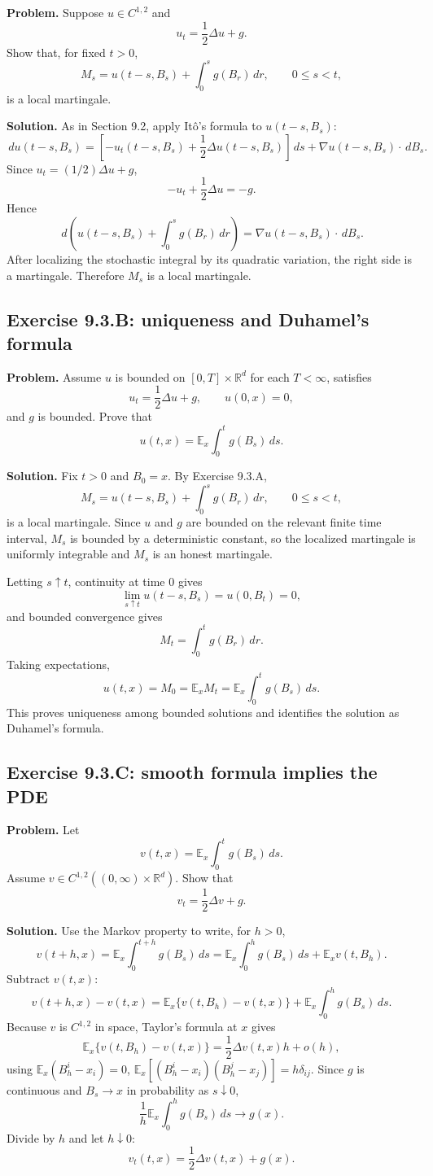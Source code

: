 \documentclass[11pt]{article}
\newcommand{\R}{\mathbb{R}}
\newcommand{\E}{\mathbb{E}}
\newcommand{\dd}{\,d}
\newcommand{\Del}{\Delta}
\begin{document}
\noindent\textbf{Problem.}
Suppose $u\in C^{1,2}$ and
\[
  u_t=\frac12\Del u+g.
\]
Show that, for fixed $t>0$,
\[
  M_s=u(t-s,B_s)+\int_0^s g(B_r)\dd r,\qquad 0\le s<t,
\]
is a local martingale.

\noindent\textbf{Solution.}
As in Section 9.2, apply It\^o's formula to $u(t-s,B_s)$:
\[
  \dd u(t-s,B_s)
  =
  \left[-u_t(t-s,B_s)+\frac12\Del u(t-s,B_s)\right]\dd s
  +\nabla u(t-s,B_s)\cdot\dd B_s.
\]
Since $u_t=(1/2)\Del u+g$,
\[
  -u_t+\frac12\Del u=-g.
\]
Hence
\[
  \dd\left(u(t-s,B_s)+\int_0^s g(B_r)\dd r\right)
  =
  \nabla u(t-s,B_s)\cdot\dd B_s.
\]
After localizing the stochastic integral by its quadratic variation,
the right side is a martingale.  Therefore $M_s$ is a local martingale.

\subsection*{Exercise 9.3.B: uniqueness and Duhamel's formula}

\noindent\textbf{Problem.}
Assume $u$ is bounded on $[0,T]\times\R^d$ for each $T<\infty$,
satisfies
\[
  u_t=\frac12\Del u+g,\qquad u(0,x)=0,
\]
and $g$ is bounded.  Prove that
\[
  u(t,x)=\E_x\int_0^t g(B_s)\dd s.
\]

\noindent\textbf{Solution.}
Fix $t>0$ and $B_0=x$.  By Exercise 9.3.A,
\[
  M_s=u(t-s,B_s)+\int_0^s g(B_r)\dd r,\qquad 0\le s<t,
\]
is a local martingale.  Since $u$ and $g$ are bounded on the relevant
finite time interval, $M_s$ is bounded by a deterministic constant, so
the localized martingale is uniformly integrable and $M_s$ is an honest
martingale.

Letting $s\uparrow t$, continuity at time $0$ gives
\[
  \lim_{s\uparrow t}u(t-s,B_s)=u(0,B_t)=0,
\]
and bounded convergence gives
\[
  M_t=\int_0^t g(B_r)\dd r.
\]
Taking expectations,
\[
  u(t,x)=M_0=\E_xM_t
  =
  \E_x\int_0^t g(B_s)\dd s.
\]
This proves uniqueness among bounded solutions and identifies the
solution as Duhamel's formula.

\subsection*{Exercise 9.3.C: smooth formula implies the PDE}

\noindent\textbf{Problem.}
Let
\[
  v(t,x)=\E_x\int_0^t g(B_s)\dd s.
\]
Assume $v\in C^{1,2}((0,\infty)\times\R^d)$.  Show that
\[
  v_t=\frac12\Del v+g.
\]

\noindent\textbf{Solution.}
Use the Markov property to write, for $h>0$,
\[
  v(t+h,x)
  =
  \E_x\int_0^{t+h}g(B_s)\dd s
  =
  \E_x\int_0^h g(B_s)\dd s+\E_x v(t,B_h).
\]
Subtract $v(t,x)$:
\[
  v(t+h,x)-v(t,x)
  =
  \E_x\{v(t,B_h)-v(t,x)\}
  +\E_x\int_0^h g(B_s)\dd s.
\]
Because $v$ is $C^{1,2}$ in space, Taylor's formula at $x$ gives
\[
  \E_x\{v(t,B_h)-v(t,x)\}
  =
  \frac12\Del v(t,x)h+o(h),
\]
using $\E_x(B_h^i-x_i)=0$,
$\E_x[(B_h^i-x_i)(B_h^j-x_j)]=h\delta_{ij}$.  Since $g$ is continuous
and $B_s\to x$ in probability as $s\downarrow0$,
\[
  \frac1h\E_x\int_0^h g(B_s)\dd s\to g(x).
\]
Divide by $h$ and let $h\downarrow0$:
\[
  v_t(t,x)=\frac12\Del v(t,x)+g(x).
\]
\end{document}

